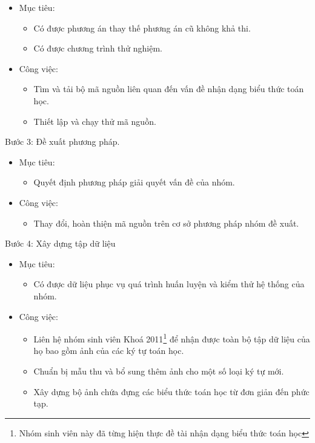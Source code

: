 \documentclass[a4paper]{article}
\theoremstyle{definition}
\begin{document}
	\begin{itemize}
		\item Mục tiêu: 
		\begin{itemize}
			\item Có được phương án thay thế phương án cũ không khả thi.
			\item Có được chương trình thử nghiệm.
		\end{itemize}
		\item Công việc:
		\begin{itemize}
			\item Tìm và tải bộ mã nguồn liên quan đến vấn đề nhận dạng biểu thức toán học\cite{github}.
			\item Thiết lập và chạy thử mã nguồn.
			
		\end{itemize}
	\end{itemize}
	Bước 3: Đề xuất phương pháp.
	\begin{itemize}
		\item Mục tiêu:
		\begin{itemize}
			\item Quyết định phương pháp giải quyết vấn đề của nhóm.
			
		\end{itemize}
		\item Công việc:
		\begin{itemize}
			\item Thay đổi, hoàn thiện mã nguồn trên cơ sở phương pháp nhóm đề xuất.
			
		\end{itemize}
	\end{itemize}
	Bước 4: Xây dựng tập dữ liệu
	\begin{itemize}
		\item Mục tiêu:
		\begin{itemize}
			\item Có được dữ liệu phục vụ quá trình huấn luyện và kiểm thử hệ thống của nhóm.
			
		\end{itemize}
		\item Công việc:
		\begin{itemize}
			\item Liên hệ nhóm sinh viên Khoá 2011\footnote{Nhóm sinh viên này đã từng hiện thực đề tài nhận dạng biểu thức toán học} để nhận được toàn bộ tập dữ liệu của họ bao gồm ảnh của các ký tự toán học.
			\item Chuẩn bị mẫu thu và bổ sung thêm ảnh cho một số loại ký tự mới.
			\item Xây dựng bộ ảnh chứa đựng các biểu thức toán học từ đơn giản đến phức tạp.
		\end{itemize}
	\end{itemize}
\end{document}
